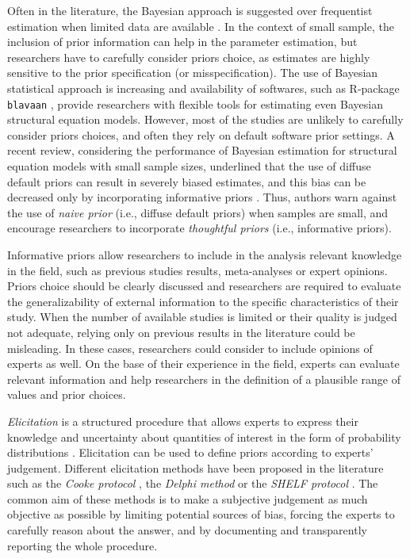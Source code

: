 \documentclass[graybox]{svmult}
\begin{document}
Often in the literature, the Bayesian approach is suggested over frequentist estimation when limited data are available \cite{mcneishUsingBayesianMethods2016a}.  In the context of small sample, the inclusion of prior information can help in the parameter estimation, but researchers have to carefully consider priors choice, as estimates are highly sensitive to the prior specification (or misspecification). The use of Bayesian statistical approach is increasing and availability of softwares, such as R-package \texttt{blavaan} \cite{merkleBlavaanBayesianStructural2018},  provide researchers with flexible tools for estimating even Bayesian structural equation models. However, most of the studies are unlikely to carefully consider priors choices, and often they rely on default software prior settings. A recent review, considering the performance of Bayesian estimation for structural equation models with small sample sizes, underlined that the use of diffuse default priors can result in severely biased estimates, and this bias can be decreased only by incorporating informative priors \cite{smidBayesianFrequentistEstimation2020}. Thus, authors warn against the use of \emph{naive prior} (i.e., diffuse default priors) when samples are small, and encourage researchers to incorporate \emph{thoughtful priors} (i.e., informative priors).

Informative priors allow researchers to include in the analysis relevant knowledge in the field, such as previous studies results, meta-analyses or expert opinions. Priors choice should be clearly discussed and researchers are required to evaluate the generalizability of external information to the specific characteristics of their study. When the number of available studies is limited or their quality is judged not adequate, relying only on previous results in the literature could be misleading. In these cases, researchers could consider to include opinions of experts as well. On the base of their experience in the field, experts can evaluate relevant information and help researchers in the definition of a plausible range of values and prior choices.

\emph{Elicitation} is a structured procedure that allows experts to express their knowledge and uncertainty about quantities of interest in the form of probability distributions \cite{ohaganExpertKnowledgeElicitation2019}. Elicitation can be used to define priors according to  experts' judgement. Different elicitation methods have been proposed in the literature such as the \emph{Cooke protocol} \cite{cookeExpertsUncertaintyOpinion1991}, the \emph{Delphi method} \cite{roweDelphiTechniqueForecasting1999} or the \emph{SHELF protocol} \cite{oakleySHELFSheffieldElicitation2016}. The common aim of these methods is to make a subjective judgement as much objective as possible by limiting potential sources of bias, forcing the experts to carefully reason about the answer, and by documenting and transparently reporting the whole procedure.
\end{document}

